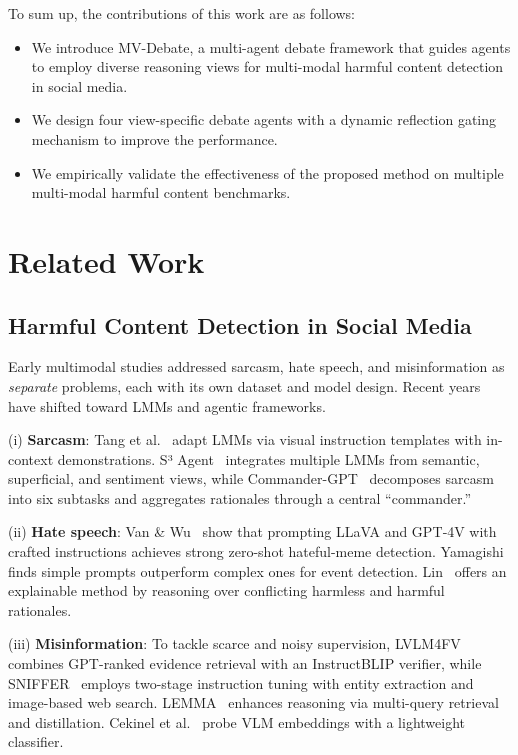 \documentclass[letterpaper]{article} %
\begin{document}
To sum up, the contributions of this work are as follows:
\begin{itemize}
    \item We introduce MV-Debate, a multi-agent debate framework that guides agents to employ diverse reasoning views for multi-modal harmful content detection in social media.
    \item We design four view-specific debate agents with a dynamic reflection gating mechanism to improve the performance.
    \item We empirically validate the effectiveness of the proposed method on multiple multi-modal harmful content benchmarks.
\end{itemize}

\section{Related Work}
\label{sec:related}

\subsection{Harmful Content Detection in Social Media}
Early multimodal studies addressed sarcasm, hate speech, and misinformation as \emph{separate} problems, each with its own dataset and model design. Recent years have shifted toward LMMs and agentic frameworks.

(i) \textbf{Sarcasm}: Tang et al.~\cite{Tang2024GenerativeMLLM} adapt LMMs via visual instruction templates with in-context demonstrations. S³ Agent~\cite{Wang2024S3Agent} integrates multiple LMMs from semantic, superficial, and sentiment views, while Commander-GPT~\cite{Zhang2025CommanderGPT} decomposes sarcasm into six subtasks and aggregates rationales through a central “commander.”

(ii) \textbf{Hate speech}: Van \& Wu~\cite{vanwu2023vlm} show that prompting LLaVA and GPT‑4V with crafted instructions achieves strong zero-shot hateful-meme detection. Yamagishi~\cite{yamagishi2024zeroshot} finds simple prompts outperform complex ones for event detection. Lin~\cite{Lin2024TowardsEH} offers an explainable method by reasoning over conflicting harmless and harmful rationales.

(iii) \textbf{Misinformation}: To tackle scarce and noisy supervision, LVLM4FV~\cite{tahmasebi2024lvlm4fv} combines GPT-ranked evidence retrieval with an InstructBLIP verifier, while SNIFFER~\cite{qi2024sniffer} employs two-stage instruction tuning with entity extraction and image-based web search. LEMMA~\cite{xuan2024lemma} enhances reasoning via multi-query retrieval and distillation. Cekinel et al.~\cite{cekinel2025probing} probe VLM embeddings with a lightweight classifier.
\end{document}
